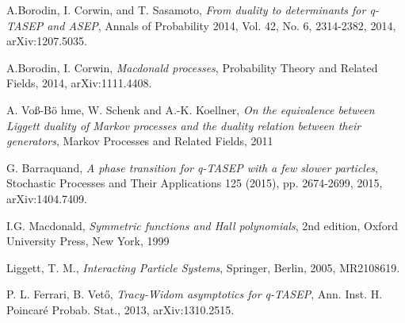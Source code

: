 \begin{singlespace}



\begin{thebibliography}{9}

  A.Borodin, I. Corwin, and T. Sasamoto,
  \emph{From duality to determinants for q-TASEP and ASEP},
  Annals of Probability 2014,
  Vol. 42, No. 6, 2314-2382,
  2014,
  arXiv:1207.5035.

  A.Borodin, I. Corwin,
  \emph{Macdonald processes},
  Probability Theory and Related Fields,
  2014,
  arXiv:1111.4408.

  A. Vo\ss -B\"o hme, W. Schenk and A.-K. Koellner,
  \emph{On the equivalence between Liggett duality of Markov processes and the duality relation between their generators},
  Markov Processes and Related Fields,
  2011

  G. Barraquand,
  \emph{A phase transition for q-TASEP with a few slower particles},
  Stochastic Processes and Their Applications 125 (2015),
  pp. 2674-2699,
  2015,
  arXiv:1404.7409.

  I.G. Macdonald,
  \emph{Symmetric functions and Hall polynomials},
  2nd edition, 
  Oxford University Press,
  New York,
  1999

  Liggett, T. M.,
  \emph{Interacting Particle Systems},
  Springer,
  Berlin,
  2005,
  MR2108619.

  P. L. Ferrari, B. Vet\H o,
  \emph{Tracy-Widom asymptotics for q-TASEP},
  Ann. Inst. H. Poincar\' e Probab. Stat.,
  2013,
  arXiv:1310.2515.

\end{thebibliography}

\end{singlespace}
